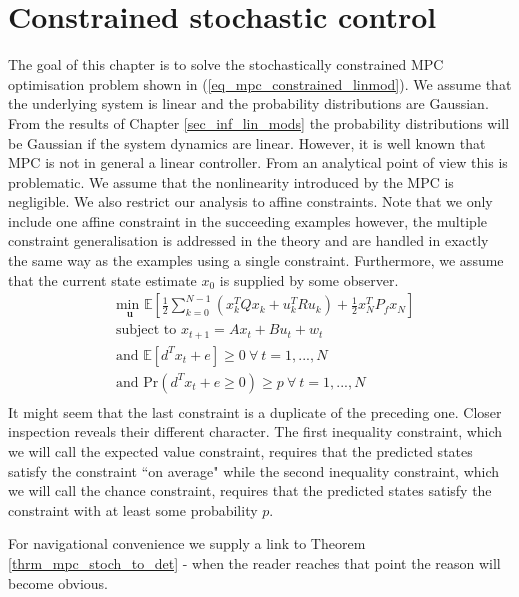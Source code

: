 \section{Constrained stochastic control}
\label{sec_lin_mpc_constained}
The goal of this chapter is to solve the stochastically constrained MPC optimisation problem shown in (\ref{eq_mpc_constrained_linmod}). We assume that the underlying system is linear and the probability distributions are Gaussian. From the results of Chapter \ref{sec_inf_lin_mods} the probability distributions will be Gaussian if the system dynamics are linear. However, it is well known \cite{mac} that MPC is not in general a linear controller. From an analytical point of view this is problematic. We assume that the nonlinearity introduced by the MPC is negligible. We also restrict our analysis to affine constraints. Note that we only include one affine constraint in the succeeding examples however, the multiple constraint generalisation is addressed in the theory and are handled in exactly the same way as the examples using a single constraint. Furthermore, we assume that the current state estimate $x_0$ is supplied by some observer.
\begin{equation}
\begin{aligned}
&\underset{\mathbf{u}}{\text{min }} \mathbb{E}\left[ \frac{1}{2}\sum_{k=0}^{N-1} \left( x_k^TQx_k + u_k^TRu_k \right) + \frac{1}{2}x_N^TP_fx_N \right] \\
& \text{subject to } x_{t+1}=Ax_t+Bu_t + w_t \\
& \text{and } \mathbb{E}[d^Tx_t + e] \geq 0 ~\forall ~t=1,...,N \\
& \text{and } \text{Pr}(d^Tx_t + e \geq 0) \geq p ~\forall ~t=1,...,N\\
\end{aligned}
\label{eq_mpc_constrained_linmod}
\end{equation}
It might seem that the last constraint is a duplicate of the preceding one. Closer inspection reveals their different character. The first inequality constraint, which we will call the expected value constraint, requires that the predicted states satisfy the constraint ``on average" while the second inequality constraint, which we will call the chance constraint, requires that the predicted states satisfy the constraint with at least some probability $p$. 

For navigational convenience we supply a link to Theorem \ref{thrm_mpc_stoch_to_det} - when the reader reaches that point the reason will become obvious.

